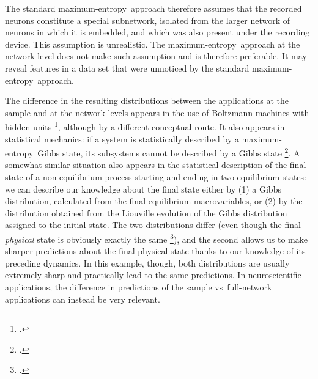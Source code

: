\documentclass[\ifafour a4paper,12pt,\else a5paper,10pt,\fi%
onecolumn,oneside,article,%
british%
]{memoir}
\theoremstyle{remark}
\theoremstyle{innote}
\newcommand*{\citep}{\footcites}
\renewcommand*{\|}[1][]{\nonscript\,#1\vert\nonscript\;\mathopen{}}
\newcommand*{\sect}{\S}%
\newcommand*{\vs}{{vs}}
\newcommand*{\me}{maximum-entropy}
\begin{document}
The standard \me\ approach therefore assumes that the recorded neurons
constitute a special subnetwork, isolated from the larger network of
neurons in which it is embedded, and which was also present under the
recording device. This assumption is unrealistic. The \me\ approach at the
network level does not make such assumption and is therefore preferable.
It may reveal features in a data set that were unnoticed by the standard
\me\ approach.



The difference in the resulting distributions between the applications at
the sample and at the network levels appears in the use of Boltzmann
machines with hidden units \citep{lerouxetal2008}, although by a different
conceptual route. It also appears in statistical mechanics: if a system is
statistically described by a \me\ Gibbs state, its subsystems cannot be
described by a Gibbs state \citep{maesetal1999}. A somewhat similar
situation also appears in the statistical description of the final state of
a non-equilibrium process starting and ending in two equilibrium states: we
can describe our knowledge about the final state either by (1) a Gibbs
distribution, calculated from the final equilibrium macrovariables, or (2)
by the distribution obtained from the Liouville evolution of the Gibbs
distribution assigned to the initial state. The two distributions differ
(even though the final \emph{physical} state is obviously exactly the same
\citep[\sect~4]{jaynes1985d_r1993}), and the second allows us to make
sharper predictions about the final physical state thanks to our knowledge
of its preceding dynamics. In this example, though, both distributions are
usually extremely sharp and practically lead to the same predictions. In
neuroscientific applications, the difference in predictions of the sample
\vs\ full-network applications can instead be very relevant.
\end{document}
